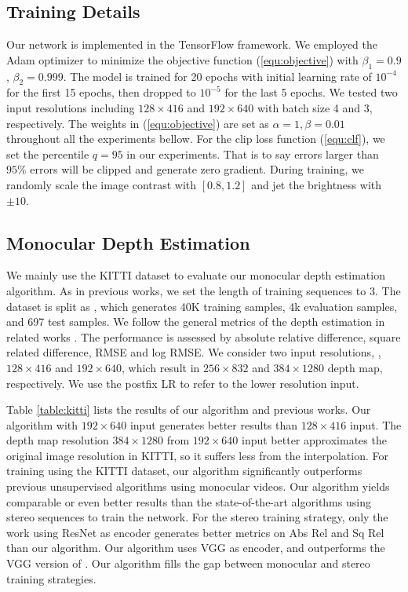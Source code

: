 \documentclass[10pt,twocolumn,letterpaper]{article}
\begin{document}
\subsection{Training Details}
Our network is implemented in the TensorFlow framework. We employed the Adam \cite{kingma2014adam}  optimizer to minimize the objective function (\ref{equ:objective}) with ${{\beta }_{1}}=0.9$, ${{\beta }_{2}}=0.999$. The model is trained for 20 epochs  with initial learning rate of ${{10}^{-4}}$ for the first 15 epochs, then dropped to ${{10}^{-5}}$ for the last 5 epochs. We tested two input resolutions including $128\times 416$ and  $192\times 640$ with batch size 4 and 3, respectively. The weights in (\ref{equ:objective}) are set as $\alpha =1,\beta =0.01$ throughout all the experiments bellow. For the clip loss function (\ref{equ:clf}), we set the percentile $q=95$ in our experiments. That is to say errors larger than $95\%$ errors 
will be clipped and generate zero gradient. During training, we randomly scale the  image contrast with $[0.8, 1.2]$ and jet the brightness with $ \pm 10$.

\subsection{Monocular Depth Estimation}
We mainly use the KITTI dataset \cite{KITTI} to evaluate our monocular depth estimation algorithm. As in previous works, we set the length of training sequences to 3.  The dataset is split as \cite{EigenDepth}, which generates 40K training samples, 4k evaluation samples, and 697 test samples. We follow the general metrics of the depth estimation in related works \cite{zhou2017unsupervised,wang2018learning}. The performance is assessed by absolute relative difference, square related difference, RMSE and log RMSE. We consider two input resolutions, \ie, $128\times 416$ and $192\times 640$, which result in $256\times 832$ and $384\times 1280$ depth map, respectively. We use the postfix LR to refer to the lower resolution input. 

Table \ref{table:kitti} lists the results of our algorithm and previous works. Our algorithm with  $192\times 640$  input generates better results than $128\times 416$   input.  The depth map resolution  $384\times 1280$  from  $192\times 640$  input better approximates the original image resolution in KITTI, so it suffers less from  the  interpolation. For training using the KITTI dataset, our algorithm significantly outperforms previous unsupervised algorithms using monocular videos. Our algorithm yields comparable or even better results than the state-of-the-art algorithms using stereo sequences to train the network.  For the stereo training strategy, only the work \cite{poggi2018learning,mehta2018structured}  using ResNet \cite{he2016deep} as encoder generates better metrics on Abs Rel and Sq Rel than our algorithm. Our algorithm uses VGG as encoder, and outperforms the VGG version of \cite{poggi2018learning}. Our algorithm fills the gap between  monocular and stereo training strategies.
\end{document}

